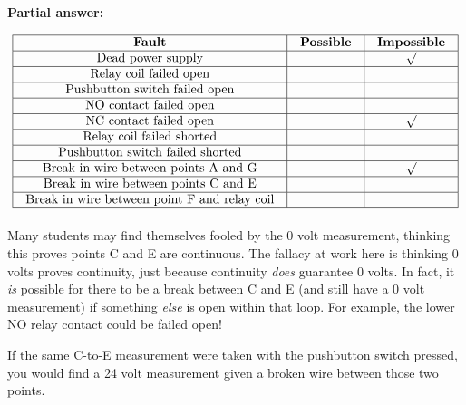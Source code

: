 





\noindent
{\bf Partial answer:}

\vskip 10pt


$$\vbox{\offinterlineskip
\halign{\strut
\vrule \quad\hfil # \ \hfil & 
\vrule \quad\hfil # \ \hfil & 
\vrule \quad\hfil # \ \hfil \vrule \cr
\noalign{\hrule}
%
{\bf Fault} & {\bf Possible} & {\bf Impossible} \cr
%
\noalign{\hrule}
%
Dead power supply &  & $\surd$ \cr
%
\noalign{\hrule}
%
Relay coil failed open &  &  \cr
%
\noalign{\hrule}
%
Pushbutton switch failed open &  &  \cr
%
\noalign{\hrule}
%
NO contact failed open & &  \cr
%
\noalign{\hrule}
%
NC contact failed open &  & $\surd$ \cr
%
\noalign{\hrule}
%
Relay coil failed shorted &  &  \cr
%
\noalign{\hrule}
%
Pushbutton switch failed shorted &  &  \cr
%
\noalign{\hrule}
%
Break in wire between points A and G &  & $\surd$ \cr
%
\noalign{\hrule}
%
Break in wire between points C and E &  &  \cr
%
\noalign{\hrule}
%
Break in wire between point F and relay coil &  &  \cr
%
\noalign{\hrule}
} %
}$$ %

Many students may find themselves fooled by the 0 volt measurement, thinking this proves points C and E are continuous.  The fallacy at work here is thinking 0 volts proves continuity, just because continuity {\it does} guarantee 0 volts.  In fact, it {\it is} possible for there to be a break between C and E (and still have a 0 volt measurement) if something {\it else} is open within that loop.  For example, the lower NO relay contact could be failed open!

If the same C-to-E measurement were taken with the pushbutton switch pressed, you would find a 24 volt measurement given a broken wire between those two points.








